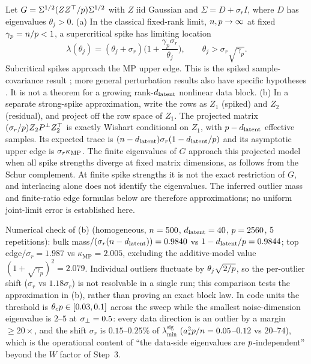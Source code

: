 \begin{remark}\label{lem:fourbulk-bbp}
Let $G=\Sigma^{1/2}(ZZ^\top/p)\Sigma^{1/2}$ with $Z$ iid Gaussian and $\Sigma=D+\sigma_rI$, where $D$ has eigenvalues $\theta_j>0$.
(a) In the classical fixed-rank limit, $n,p\to\infty$ at fixed $\gamma_p=n/p<1$, a supercritical spike has limiting location
\begin{equation}\label{eq:fourbulk-bbp}
\lambda(\theta_j)=(\theta_j+\sigma_r)\Big(1+\frac{\gamma_p\sigma_r}{\theta_j}\Big),\qquad \theta_j>\sigma_r\sqrt{\gamma_p}.
\end{equation}
Subcritical spikes approach the MP upper edge. This is the spiked sample-covariance result \citep{baik2005phase,baik2006eigenvalues}; more general perturbation results also have specific hypotheses \citep{benaychgeorges2011eigenvalues}. It is not a theorem for a growing rank-$d_{\mathrm{latent}}$ nonlinear data block.
(b) In a separate strong-spike approximation, write the rows as $Z_1$ (spiked) and $Z_2$ (residual), and project off the row space of $Z_1$. The projected matrix $(\sigma_r/p)Z_2P^\perp Z_2^\top$ is exactly Wishart conditional on $Z_1$, with $p-d_{\mathrm{latent}}$ effective samples. Its expected trace is $(n-d_{\mathrm{latent}})\sigma_r(1-d_{\mathrm{latent}}/p)$ and its asymptotic upper edge is $\sigma_r\kappa_{\rm MP}$. The finite eigenvalues of $G$ approach this projected model when all spike strengths diverge at fixed matrix dimensions, as follows from the Schur complement. At finite spike strengths it is not the exact restriction of $G$, and interlacing alone does not identify the eigenvalues. The inferred outlier mass and finite-ratio edge formulas below are therefore approximations; no uniform joint-limit error is established here.
\end{remark}
Numerical check of (b) (homogeneous, $n=500$, $d_{\mathrm{latent}}=40$, $p=2560$, $5$ repetitions): bulk mass$/(\sigma_r(n-d_{\mathrm{latent}}))=0.9840$ vs $1-d_{\mathrm{latent}}/p=0.9844$; top edge$/\sigma_r=1.987$ vs $\kappa_{\mathrm{MP}}=2.005$, excluding the additive-model value $(1+\sqrt{\gamma_p})^2=2.079$. Individual outliers fluctuate by $\theta_j\sqrt{2/p}$, so the per-outlier shift ($\sigma_r$ vs $1.18\sigma_r$) is not resolvable in a single run; this comparison tests the approximation in (b), rather than proving an exact block law. In code units the threshold is $\theta_cp\in[0.03,0.1]$ across the sweep while the smallest noise-dimension eigenvalue is $2$--$5$ at $\sigma_{\perp}=0.5$: every data direction is an outlier by a margin $\ge20\times$, and the shift $\sigma_r$ is $0.15$--$0.25\%$ of $\lambda^{\mathrm{sig}}_{\min}$ ($a_*^2p/n=0.05$--$0.12$ vs $20$--$74$), which is the operational content of ``the data-side eigenvalues are $p$-independent'' beyond the $W$ factor of Step~3.

